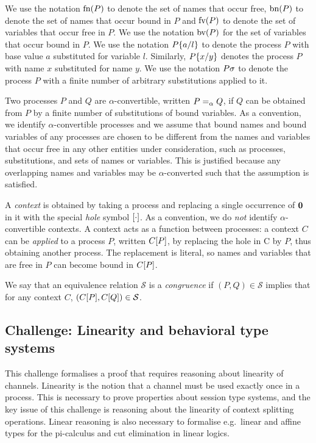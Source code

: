 \documentclass[runningheads]{llncs}
\begin{document}
We use the notation \( \textrm{fn}(P) \) to denote the set of
names that occur free,
\( \textrm{bn}(P) \) to denote the set of names that occur bound
in \( P \) and  \( \textrm{fv}(P) \)
to denote the set of variables that occur free
in \( P \).  We use the notation \( \textrm{bv}(P) \)
for the set of variables that occur bound
in \( P \).  We use the notation \( P\{a/l\} \) to denote
the process \( P \) with base value \( a \) substituted for variable
\( l \). Similarly, \( P\{x/y\} \) denotes the process
\( P \) with name \( x \) substituted for name \( y \).
We use the notation \( P\sigma \) to denote the process \( P \) with a finite number of arbitrary substitutions applied to it.

Two processes \( P \) and \( Q \) are \( \alpha \)-convertible,
written \( P =_{\alpha} Q \), if \( Q \) can be obtained from \( P \)
by a finite number of substitutions of bound variables.  As a
convention, we identify \( \alpha \)-convertible processes and we
assume that bound names and bound variables of any processes are
chosen to be different from the names and variables that occur
free in any other entities under consideration, such as processes,
substitutions, and sets of names or variables.  This is justified
because any overlapping names and variables may be
\( \alpha \)-converted such that the assumption is satisfied.


A \emph{context} is obtained by taking a process and replacing a single occurrence of \( \bm{0} \) in it with the special \emph{hole} symbol \( [\cdot] \).
As a convention, we do \emph{not} identify \( \alpha \)-convertible contexts.
%
A context acts as a function between processes:
a context \( C \) can be \emph{applied} to a process \( P \), written \( C[P] \), by replacing the hole in C by \( P \), thus obtaining another process.
The replacement is literal, so names and variables that are free in \( P \) can become bound in \( C[P] \).

We say that an equivalence relation \( \mathcal{S} \) is a \emph{congruence} if \( (P,Q) \in \mathcal{S} \) implies that for any context \( C \), \( (C[P], C[Q]) \in \mathcal{S} \).

\subsection{Challenge: Linearity and behavioral type systems}
\label{sec:challenge:linearity-beh-types}
This challenge formalises a proof that requires reasoning about linearity of channels.
Linearity is the notion that a channel must be used exactly once in a process.
This is necessary to prove properties about session type systems, and the key
issue of this challenge is reasoning about the linearity of context splitting operations.
Linear reasoning is also necessary to formalise e.g.\ linear and affine types for the pi-calculus and cut elimination in linear logics.
\end{document}
